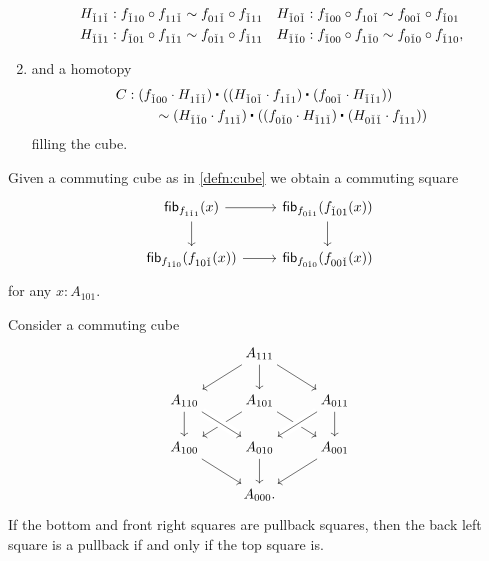 \begin{defn}
\begin{enumerate}
\begin{align*}
H_{\check{1}1\check{1}} & : f_{\check{1}10}\circ f_{11\check{1}} \sim f_{01\check{1}}\circ f_{\check{1}11} & H_{\check{1}0\check{1}} & : f_{\check{1}00}\circ f_{10\check{1}} \sim f_{00\check{1}}\circ f_{\check{1}01} \\
H_{\check{1}\check{1}1} & : f_{\check{1}01}\circ f_{1\check{1}1} \sim f_{0\check{1}1}\circ f_{\check{1}11} & H_{\check{1}\check{1}0} & : f_{\check{1}00}\circ f_{1\check{1}0} \sim f_{0\check{1}0}\circ f_{\check{1}10},
\end{align*}
\item and a homotopy 
\begin{align*}
C & : \ct{(f_{\check{1}00}\cdot H_{1\check{1}\check{1}})}{(\ct{(H_{\check{1}0\check{1}}\cdot f_{1\check{1}1})}{(f_{00\check{1}}\cdot H_{\check{1}\check{1}1})})} \\
& \qquad \htpy \ct{(H_{\check{1}\check{1}0}\cdot f_{11\check{1}})}{(\ct{(f_{0\check{1}0}\cdot H_{\check{1}1\check{1}})}{(H_{0\check{1}\check{1}}\cdot f_{\check{1}11})})}
\end{align*}
filling the cube.
\end{enumerate}
\end{defn}

\begin{lem}
Given a commuting cube as in \cref{defn:cube} we obtain a commuting square
\begin{equation*}
\begin{tikzcd}
\fib{f_{1\check{1}1}}{x} \arrow[r] \arrow[d] & \fib{f_{0\check{1}1}}{f_{\check{1}01}(x)} \arrow[d] \\
\fib{f_{1\check{1}0}}{f_{10\check{1}}(x)} \arrow[r] & \fib{f_{0\check{1}0}}{f_{00\check{1}}(x)}
\end{tikzcd}
\end{equation*}
for any $x:A_{101}$. 
\end{lem}

\begin{lem}
Consider a commuting cube
\begin{equation*}
\begin{tikzcd}
& A_{111} \arrow[dl] \arrow[dr] \arrow[d] \\
A_{110} \arrow[d] & A_{101} \arrow[dl] \arrow[dr] & A_{011} \arrow[dl,crossing over] \arrow[d] \\
A_{100} \arrow[dr] & A_{010} \arrow[d] \arrow[from=ul,crossing over] & A_{001} \arrow[dl] \\
& A_{000}.
\end{tikzcd}
\end{equation*}
If the bottom and front right squares are pullback squares, then the back left square is a pullback if and only if the top square is.
\end{lem}

